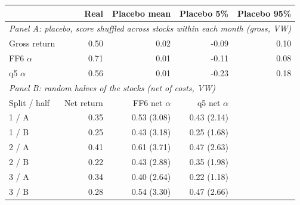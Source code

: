 \begin{tabular}{lrrrr}
\toprule
 & Real & Placebo mean & Placebo 5\% & Placebo 95\% \\
\midrule
\multicolumn{5}{l}{\textit{Panel A: placebo, score shuffled across stocks within each month (gross, VW)}} \\
Gross return & 0.50 & 0.02 & -0.09 & 0.10 \\
FF6 $\alpha$ & 0.71 & 0.01 & -0.11 & 0.08 \\
q5 $\alpha$ & 0.56 & 0.01 & -0.23 & 0.18 \\
\midrule
\multicolumn{5}{l}{\textit{Panel B: random halves of the stocks (net of costs, VW)}} \\
Split / half & Net return & FF6 net $\alpha$ & q5 net $\alpha$ &  \\
1 / A & 0.35 & 0.53 (3.08) & 0.43 (2.14) &  \\
1 / B & 0.25 & 0.43 (3.18) & 0.25 (1.68) &  \\
2 / A & 0.41 & 0.61 (3.71) & 0.47 (2.63) &  \\
2 / B & 0.22 & 0.43 (2.88) & 0.35 (1.98) &  \\
3 / A & 0.34 & 0.40 (2.64) & 0.22 (1.18) &  \\
3 / B & 0.28 & 0.54 (3.30) & 0.47 (2.66) &  \\
\bottomrule
\end{tabular}
